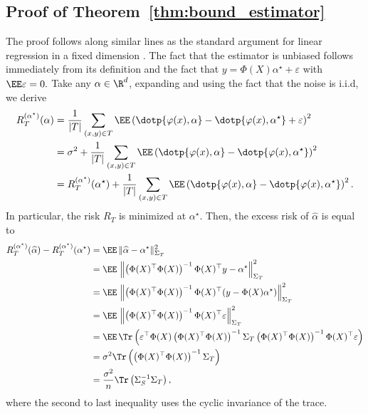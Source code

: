 \subsection{Proof of Theorem~\ref{thm:bound_estimator}}
The proof follows along similar lines as the standard argument for linear regression in a fixed dimension \cite[Proposition 3.5]{bach2024learning}.
The fact that the estimator is unbiased follows immediately from its definition and the fact that $y = \Phi(X)\alpha^{\star} + \varepsilon$ with $\EE\varepsilon = 0.$  
Take any $\alpha \in \R^d$, expanding and using the fact that the noise is i.i.d, we derive 
\begin{align}\begin{split}
R_{T}^{(\alpha^{\star})}(\alpha) &= \frac{1}{|T|}  \sum_{(x, y) \in T} \EE\left( \dotp{\varphi(x),  \alpha} - \dotp{\varphi(x), \alpha^{\star}} + \varepsilon \right)^2 \\
&= \sigma^2+ \frac{1}{|T|}  \sum_{(x, y) \in T}\EE \left( \dotp{\varphi(x),  \alpha} - \dotp{\varphi(x), \alpha^{\star}}  \right)^2 \notag \\
&= R_{T}^{(\alpha^{\star})}(\alpha^{\star}) + \frac{1}{|T|}  \sum_{(x, y) \in T} \EE\left( \dotp{\varphi(x),  \alpha} - \dotp{\varphi(x), \alpha^{\star}}  \right)^2.
\end{split}
\end{align}
In particular, the risk $R_T$ is minimized at $\alpha^{\star}$. Then, the excess risk of $\widehat \alpha$ is equal to
\begin{align*}
R_{T}^{(\alpha^{\star})}(\widehat \alpha) - R_{T}^{(\alpha^{\star})}(\alpha^{\star}) &= \EE\,\|\widehat \alpha - \alpha^{\star}\|^2_{\Sigma_{T}} \\
&= \EE\,\left\|\left(\Phi(X)^\top \Phi(X)\right)^{-1}\Phi(X)^\top y -\alpha^{\star}\right\|^2_{\Sigma_{T}}\\
&= \EE\,\left\|\left(\Phi(X)^\top \Phi(X)\right)^{-1}\Phi(X)^\top ( y - \Phi(X) \alpha^{\star})\right\|^2_{\Sigma_{T}} \\
&= \EE\,\left\|\left(\Phi(X)^\top \Phi(X)\right)^{-1}\Phi(X)^\top\varepsilon\right\|^2_{\Sigma_{T}} \\
&= \EE\,\Tr\left(\varepsilon^\top\Phi(X)\left(\Phi(X)^\top \Phi(X)\right)^{-1}\Sigma_{T}\left(\Phi(X)^\top \Phi(X)\right)^{-1}\Phi(X)^\top\varepsilon\right)\\
&= \sigma^2 \Tr\left(\left(\Phi(X)^\top \Phi(X)\right)^{-1} \Sigma_{{T}}\right) \\
&= \frac{\sigma^2}{n}\Tr\left(\Sigma_{S}^{-1}\Sigma_{{T}}\right),
\end{align*}
where the second to last inequality uses the cyclic invariance of the trace.

